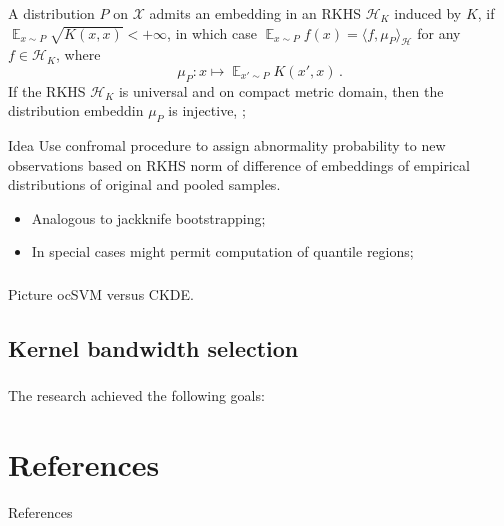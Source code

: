 \documentclass[t]{beamer}  %
\newcommand{\Xcal}{\mathcal{X}}
\newcommand{\Hcal}{\mathcal{H}}
\newcommand{\ex}{\mathop{\mathbb{E}}\nolimits}
\begin{document}
\begin{frame}[c]\frametitle{\insertsection}
  \framesubtitle{\insertsubsection}
    A distribution $P$ on $\Xcal$ admits an embedding in an RKHS $\Hcal_K$ induced
    by $K$, if $\ex_{x\sim P} \sqrt{K(x,x)} < +\infty$, in which case $\ex_{x\sim P} f(x)
    = \langle f, \mu_P \rangle_\Hcal $ for any $f\in \Hcal_K$, where
    $$ \mu_P: x \mapsto \ex_{x'\sim P} K(x', x) \,. $$
    If the RKHS $\Hcal_K$ is universal and on compact metric domain, then the distribution
    embeddin $\mu_P$ is injective, \cite{gretton2012};

    \begin{block}{Idea}
    Use confromal procedure to assign abnormality probability to new observations
    based on RKHS norm of difference of embeddings of empirical distributions of
    original and pooled samples.
    \begin{itemize}
      \item Analogous to jackknife bootstrapping;
      \item In special cases might permit computation of quantile regions;
    \end{itemize}
    \end{block}
\end{frame}

\begin{frame}[c]\frametitle{\insertsection}
  \framesubtitle{\insertsubsection}
      Picture ocSVM versus CKDE.
\end{frame}


\subsection{Kernel bandwidth selection} %
\label{sub:kernel_bandwidth_selection}

\begin{frame}[c]\frametitle{\insertsection}

  The research achieved the following goals:
\end{frame}



\section{References} %
\label{sec:references}

\begin{frame}[t]{References}  
  
  
\end{frame}

\end{document}
